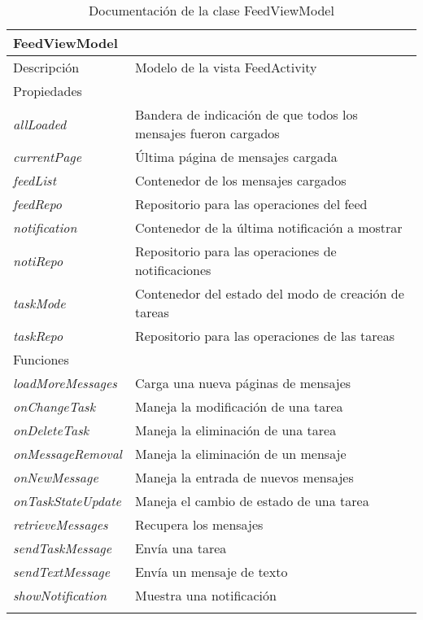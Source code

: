 \begin{longtable}{|p{} p{}|}
    \hline
    \multicolumn{2}{|l|}{\textbf{FeedViewModel}} \\ \hline \hline
    Descripción      & Modelo de la vista FeedActivity \\ \hline
    \multicolumn{2}{|l|}{Propiedades} \\
    \emph{allLoaded}  & Bandera de indicación de que todos los mensajes fueron cargados  \\
    \emph{currentPage}  & Última página de mensajes cargada  \\
    \emph{feedList}  & Contenedor de los mensajes cargados  \\
    \emph{feedRepo}  & Repositorio para las operaciones del feed  \\
    \emph{notification}  & Contenedor de la última notificación a mostrar  \\
    \emph{notiRepo}  & Repositorio para las operaciones de notificaciones  \\
    \emph{taskMode}  & Contenedor del estado del modo de creación de tareas  \\
    \emph{taskRepo}  & Repositorio para las operaciones de las tareas  \\ \hline
    \multicolumn{2}{|l|}{Funciones} \\
    \emph{loadMoreMessages}  & Carga una nueva páginas de mensajes \\
    \emph{onChangeTask}  & Maneja la modificación de una tarea  \\ 
    \emph{onDeleteTask}  & Maneja la eliminación de una tarea  \\ 
    \emph{onMessageRemoval}  & Maneja la eliminación de un mensaje  \\ 
    \emph{onNewMessage}  & Maneja la entrada de nuevos mensajes  \\ 
    \emph{onTaskStateUpdate}  & Maneja el cambio de estado de una tarea  \\ 
    \emph{retrieveMessages}  & Recupera los mensajes  \\ 
    \emph{sendTaskMessage}  & Envía una tarea  \\ 
    \emph{sendTextMessage}  & Envía un mensaje de texto  \\
    \emph{showNotification}  & Muestra una notificación  \\  \hline
    \caption{Documentación de la clase FeedViewModel}
    \label{dis:app:feed_view_model}
\end{longtable}

